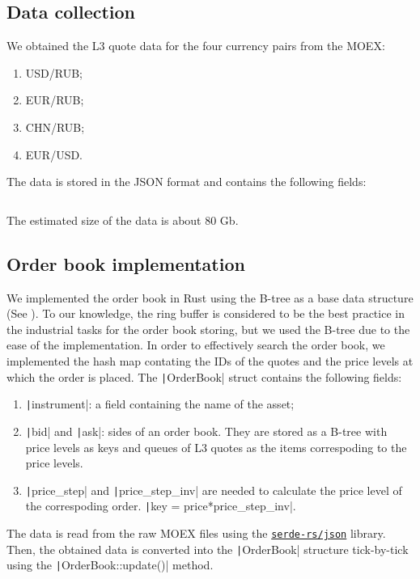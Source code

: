     \subsection{Data collection}
        We obtained the L3 quote data for the four currency pairs from the MOEX:
        \begin{enumerate}
            \item USD/RUB; 
            \item EUR/RUB; 
            \item CHN/RUB;
            \item EUR/USD.
        \end{enumerate} 
        The data is stored in the JSON format and contains the following fields: \inputminted{json}{codeminted/l3quote.json}
        \noindent The estimated size of the data is about 80 Gb. 
        
    \subsection{Order book implementation}
        We implemented the order book in Rust using the B-tree as a base data structure (See \Cite{Cormen2022}). To our knowledge, 
        the ring buffer is considered to be the best practice in the industrial tasks for the order book storing, but we used 
        the B-tree due to the ease of the implementation.
        In order to effectively search the order book, we implemented the hash map contating the IDs of the quotes and
        the price levels at which the order is placed. The \texttt|OrderBook| struct contains the following fields:
        \begin{enumerate}
            \item \texttt|instrument|: a field containing the name of the asset;
            \item \texttt|bid| and \texttt|ask|: sides of an order book. They are 
                  stored as a B-tree with price levels as keys and queues of L3 quotes as the items correspoding
                  to the price levels.
            \item \texttt|price_step| and \texttt|price_step_inv| are needed to calculate the 
                  price level of the correspoding order. \texttt|key = price*price_step_inv|.
        \end{enumerate}
        The data is read from the raw MOEX files using the \href{https://github.com/serde-rs/json}{\texttt{serde-rs/json}} library. Then, the obtained data is
        converted into the \texttt|OrderBook| structure tick-by-tick using the \texttt|OrderBook::update()| method.

